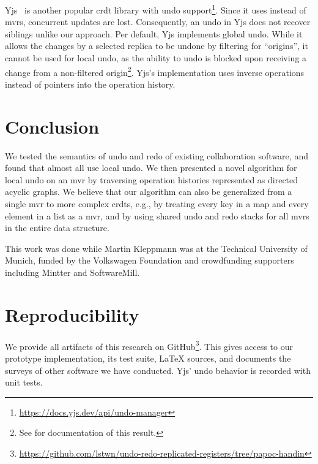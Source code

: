 \documentclass[sigplan]{acmart}
\begin{document}
Yjs~\cite{yjspaper,yjsproject} is another popular \gls{crdt} library with
undo support\footnote{\url{https://docs.yjs.dev/api/undo-manager}}.
Since it uses  instead of \glspl{mvr}, concurrent updates are lost.
Consequently, an undo in Yjs does not recover siblings unlike our approach.
Per default, Yjs implements global undo.
While it allows the changes by a selected replica to be undone
by filtering for ``origins'',
it cannot be used for local undo, as the ability to undo is blocked
upon receiving a change from a non-filtered
origin\footnote{See  for documentation of this result.}.
Yjs's implementation uses inverse operations instead of pointers into the
operation history.

\section{Conclusion}\label{sec:conclusion}

We tested the semantics of undo and redo of existing collaboration software,
and found that almost all use local undo.
We then presented a novel algorithm for local undo on an \gls*{mvr}
by traversing operation histories represented as directed acyclic graphs.
We believe that our algorithm can also be generalized from a single \gls{mvr}
to more complex \glspl{crdt}, e.g., by treating every key in a map and
every element in a list as a \gls{mvr}, and by using shared
undo and redo stacks for all \glspl{mvr} in the entire data structure.

\begin{acks}
This work was done while Martin Kleppmann was at the Technical University of Munich,
funded by the Volkswagen Foundation and crowdfunding supporters including Mintter
and SoftwareMill.
\end{acks}





\appendix

\section{Reproducibility}\label{sec:repro}

We provide all artifacts of this research on GitHub\footnote{
  \url{https://github.com/lstwn/undo-redo-replicated-registers/tree/papoc-handin}
}.
This gives access to our prototype implementation, its test suite,
\LaTeX{} sources, and documents the surveys of other software
we have conducted.
Yjs' undo behavior is recorded with unit tests.
\end{document}
